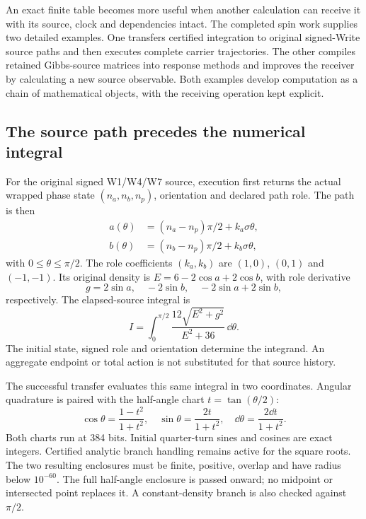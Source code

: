 \label{v3-response-composition}

An exact finite table becomes more useful when another calculation can receive it with its source, clock and dependencies intact. The completed spin work supplies two detailed examples. One transfers certified integration to original signed-Write source paths and then executes complete carrier trajectories. The other compiles retained Gibbs-source matrices into response methods and improves the receiver by calculating a new source observable. Both examples develop computation as a chain of mathematical objects, with the receiving operation kept explicit.

\subsection{The source path precedes the numerical integral}

For the original signed W1/W4/W7 source, execution first returns the actual wrapped phase state $(n_a,n_b,n_p)$, orientation and declared path role. The path is then
\begin{align}
 a(\theta)&=(n_a-n_p)\pi/2+k_a\sigma\theta,\\
 b(\theta)&=(n_b-n_p)\pi/2+k_b\sigma\theta,
\end{align}
with $0\leq\theta\leq\pi/2$. The role coefficients $(k_a,k_b)$ are $(1,0)$, $(0,1)$ and $(-1,-1)$. Its original density is $E=6-2\cos a+2\cos b$, with role derivative
\begin{equation}
 g=2\sin a,\quad -2\sin b,\quad -2\sin a+2\sin b,
\end{equation}
respectively. The elapsed-source integral is
\begin{equation}
 I=\int_0^{\pi/2}\frac{12\sqrt{E^2+g^2}}{E^2+36}\,\dd\theta.
\end{equation}
The initial state, signed role and orientation determine the integrand. An aggregate endpoint or total action is not substituted for that source history.

The successful transfer evaluates this same integral in two coordinates. Angular quadrature is paired with the half-angle chart $t=\tan(\theta/2)$:
\begin{equation}
 \cos\theta=\frac{1-t^2}{1+t^2},\quad
 \sin\theta=\frac{2t}{1+t^2},\quad
 \dd\theta=\frac{2\dd t}{1+t^2}.
\end{equation}
Both charts run at 384 bits. Initial quarter-turn sines and cosines are exact integers. Certified analytic branch handling remains active for the square roots. The two resulting enclosures must be finite, positive, overlap and have radius below $10^{-60}$. The full half-angle enclosure is passed onward; no midpoint or intersected point replaces it. A constant-density branch is also checked against $\pi/2$.

